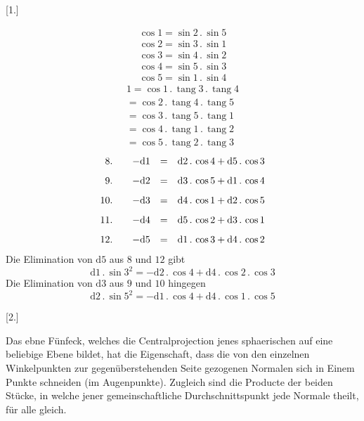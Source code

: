 \par\medskip{}\centerline{[1.]}\nobreak\smallskip
\[
\begin{gathered}
\cos 1=\sin 2\, .\,\sin 5\\[8pt]
\cos 2=\sin 3\, .\,\sin 1\\[8pt]
\cos 3=\sin 4\, .\,\sin 2\\[8pt]
\cos 4=\sin 5\, .\,\sin 3\\[8pt]
\cos 5=\sin 1\, .\,\sin 4
\end{gathered}
\]
\[
\begin{gathered}
1=\cos 1\, .\,\operatorname{tang}3\, .\,\operatorname{tang}4\\[8pt]
 =\cos 2\, .\,\operatorname{tang}4\, .\,\operatorname{tang}5\\[8pt]
 =\cos 3\, .\,\operatorname{tang}5\, .\,\operatorname{tang}1\\[8pt]
 =\cos 4\, .\,\operatorname{tang}1\, .\,\operatorname{tang}2\\[8pt]
 =\cos 5\, .\,\operatorname{tang}2\, .\,\operatorname{tang}3
\end{gathered}
\]
\[
\begin{array}{r@{\qquad}rcl}
8.&-\mathrm{d}1&=&\mathrm{d}2\, .\,\cos 4+\mathrm{d}5\, .\,\cos 3\\[8pt]
9.&-\mathrm{d}2&=&\mathrm{d}3\, .\,\cos 5+\mathrm{d}1\, .\,\cos 4\\[8pt]
10.&-\mathrm{d}3&=&\mathrm{d}4\, .\,\cos 1+\mathrm{d}2\, .\,\cos 5\\[8pt]
11.&-\mathrm{d}4&=&\mathrm{d}5\, .\,\cos 2+\mathrm{d}3\, .\,\cos 1\\[8pt]
12.&-\mathrm{d}5&=&\mathrm{d}1\, .\,\cos 3+\mathrm{d}4\, .\,\cos 2
\end{array}
\]
Die Elimination von $\mathrm{d}5$ aus $8$ und $12$ gibt
\[
\mathrm{d}1\, .\,\sin 3^2=-\mathrm{d}2\, .\,\cos 4+\mathrm{d}4\, .\,\cos 2\, .\,\cos 3
\]
Die Elimination von $\mathrm{d}3$ aus $9$ und $10$ hingegen
\[
\mathrm{d}2\, .\,\sin 5^2=-\mathrm{d}1\, .\,\cos 4+\mathrm{d}4\, .\,\cos 1\, .\,\cos 5
\]
\par\medskip{}\centerline{[2.]}\nobreak\smallskip
Das ebne Fünfeck, welches die Centralprojection jenes sphaerischen auf
eine beliebige Ebene bildet, hat die Eigenschaft, dass die von den einzelnen Winkelpunkten zur gegenüberstehenden Seite gezogenen Normalen sich in Einem
Punkte schneiden (im Augenpunkte). Zugleich sind die Producte der beiden
Stücke, in welche jener gemeinschaftliche Durchschnittspunkt jede Normale
theilt, für alle gleich.

